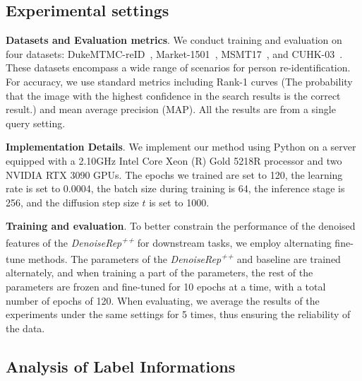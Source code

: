 \documentclass[conference]{IEEEtran}
\begin{document}
{\subsection{Experimental settings}
\label{exp_settings}
\textbf{Datasets and Evaluation metrics}. We conduct training and evaluation on four datasets: DukeMTMC-reID~\cite{zheng2017unlabeled}, Market-1501~\cite{zheng2015scalable}, MSMT17~\cite{wei2018person}, and CUHK-03~\cite{li2014deepreid}. These datasets encompass a wide range of scenarios for person re-identification. For accuracy, we use standard metrics including Rank-1 curves (The probability that the image with the highest confidence in the search results is the correct result.) and mean average precision (MAP). All the results are from a single query setting.



\textbf{Implementation Details}. We implement our method using Python on a server equipped with a 2.10GHz Intel Core Xeon (R) Gold 5218R processor and two NVIDIA RTX 3090 GPUs. The epochs we trained are set to 120, the learning rate is set to 0.0004, the batch size during training is 64, the inference stage is 256, and the diffusion step size $t$ is set to 1000.

\textbf{Training and evaluation}. To better constrain the performance of the denoised features of the \textit{DenoiseRep\textsuperscript{++}} for downstream tasks, we employ alternating fine-tune methods. The parameters of the \textit{DenoiseRep\textsuperscript{++}} and baseline are trained alternately, and when training a part of the parameters, the rest of the parameters are frozen and fine-tuned for 10 epochs at a time, with a total number of epochs of 120. When evaluating, we average the results of the experiments under the same settings for 5 times, thus ensuring the reliability of the data.

\subsection{Analysis of Label Informations}
\label{sec: Exp RD Plugin}


}
\end{document}
